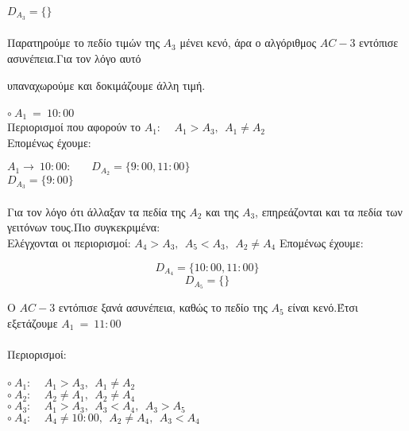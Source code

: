 \documentclass[10pt]{article}
\begin{document}
 
\hspace{32mm}$D_{A_{3}} = \{ \} $ \\ \\


Παρατηρούμε το πεδίο τιμών της $A_{3}$ μένει κενό, άρα ο αλγόριθμος $AC-3$ εντόπισε ασυνέπεια.Για τον λόγο αυτό

υπαναχωρούμε και δοκιμάζουμε άλλη τιμή. \\ \\

$\circ \ A_{1} \ = \ 10:00 $ \\

Περιορισμοί που αφορούν το $A_{1} : \ \ \ \ \ A_{1} > A_{3}, \ \ A_{1} \neq A_{2}$ \\

Επομένως έχουμε: 

$ A_{1} \rightarrow \ 10:00:  \ \ \ \ \ \ \ \ 
D_{A_{2}} = \{ 9:00, 11:00\}$ \\

 
\hspace{33mm}$D_{A_{3}} = \{9:00 \} $ \\ \\

Για τον λόγο ότι άλλαξαν τα πεδία της $A_{2}$ και της $A_{3}$, επηρεάζονται και τα πεδία των γειτόνων τους.Πιο συγκεκριμένα: \\

Ελέγχονται οι περιορισμοί: $A_{4} > A_{3}, \ \ A_{5} < A_{3}, \ \  A_{2} \neq A_{4}$ 
Επομένως έχουμε: 

\[
D_{A_{4}} = \{ 10:00, 11:00\}
\]
\[ D_{A_{5}} = \{ \} \]

Ο $AC-3$ εντόπισε ξανά ασυνέπεια, καθώς το πεδίο της $A_{5}$ είναι κενό.Έτσι εξετάζουμε $A_{1} \ = \ 11:00$ \\ \\

Περιορισμοί: \\ \\

$\circ \  A_{1}: \ \ \ \ \ A_{1} > A_{3}, \ \ A_{1} \neq A_{2}$ \\

$\circ \  A_{2}: \ \ \ \ \ A_{2} \neq A_{1}, \ \ A_{2} \neq A_{4}$ \\

$\circ \  A_{3}: \ \ \ \ \ A_{1} > A_{3}, \ \ A_{3} < A_{4}, \ \  A_{3} > A_{5}$ \\

$\circ \  A_{4}: \ \ \ \ \ A_{4} \neq 10:00, \ \ A_{2} \neq A_{4},  \ \ A_{3} < A_{4}$ \\
\end{document}
